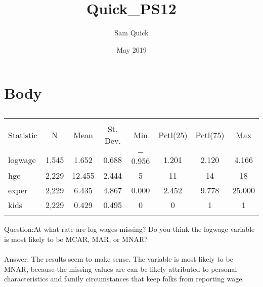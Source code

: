\documentclass{article}
\title{Quick_PS12}
\author{Sam Quick}
\date{May 2019}
\begin{document}
\maketitle



\section{Body}


\begin{table}[!htbp] \centering 
  \caption{} 
  \label{} 
\begin{tabular}{@{\extracolsep{5pt}}lccccccc} 
\\[-1.8ex]\hline 
\hline \\[-1.8ex] 
Statistic & \multicolumn{1}{c}{N} & \multicolumn{1}{c}{Mean} & \multicolumn{1}{c}{St. Dev.} & \multicolumn{1}{c}{Min} & \multicolumn{1}{c}{Pctl(25)} & \multicolumn{1}{c}{Pctl(75)} & \multicolumn{1}{c}{Max} \\ 
\hline \\[-1.8ex] 
logwage & 1,545 & 1.652 & 0.688 & $-$0.956 & 1.201 & 2.120 & 4.166 \\ 
hgc & 2,229 & 12.455 & 2.444 & 5 & 11 & 14 & 18 \\ 
exper & 2,229 & 6.435 & 4.867 & 0.000 & 2.452 & 9.778 & 25.000 \\ 
kids & 2,229 & 0.429 & 0.495 & 0 & 0 & 1 & 1 \\ 
\hline \\[-1.8ex] 
\end{tabular} 
\end{table} 


Question:At what rate are log wages missing? Do you think the logwage variable is most likely to be MCAR, MAR, or MNAR?
\\~\\
Answer: The results seem to make sense.  The variable is most likely to be MNAR, because the missing values are can be likely attributed to personal characteristics and family circumstances that keep folks from reporting wage.

\\~\\
\end{document}
